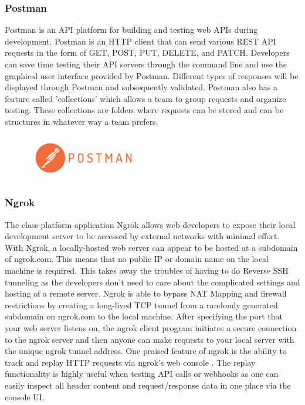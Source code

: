 \documentclass[conference]{IEEEtran}
\begin{document}
\subsubsection{Postman}
Postman is an API platform for building and testing web APIs during development. Postman is an HTTP client that can send various REST API requests in the form of GET, POST, PUT, DELETE, and PATCH. Developers can save time testing their API servers through the command line and use the graphical user interface provided by Postman. Different types of responses will be displayed through Postman and subsequently validated. Postman also has a feature called 'collections' which allows a team to group requests and organize testing. These collections are folders where requests can be stored and can be structures in whatever way a team prefers. 

\begin{figure}[hbt!]
\includegraphics[width=5cm]{imagefolder/postman.png}
\caption{}
\label{fig:map}
\end{figure}

\subsubsection{Ngrok}
The class-platform application Ngrok allows web developers to expose their local development server to be accessed by external networks with minimal effort. With Ngrok, a locally-hosted web server can appear to be hosted at a subdomain of ngrok.com. This means that no public IP or domain name on the local machine is required. This takes away the troubles of having to do Reverse SSH tunneling as the developers don't need to care about the complicated settings and hosting of a remote server. Ngrok is able to bypass NAT Mapping and firewall restrictions by creating a long-lived TCP tunnel from a randomly generated subdomain on ngrok.com to the local machine. After specifying the port that your web server listens on, the ngrok client program initiates a secure connection to the ngrok server and then anyone can make requests to your local server with the unique ngrok tunnel address. One praised feature of ngrok is the ability to track and replay HTTP requests via ngrok's web console . The replay functionality is highly useful when testing API calls or webhooks as one can easily inspect all header content and request/response data in one place via the console UI.\\
\\
\\
\end{document}
